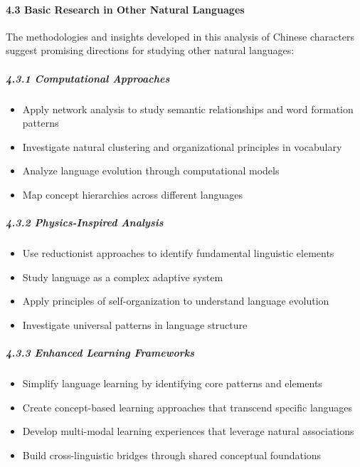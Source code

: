\paragraph{4.3 Basic Research in Other Natural
Languages}\label{basic-research-in-other-natural-languages}

The methodologies and insights developed in this analysis of Chinese
characters suggest promising directions for studying other natural
languages:

\subparagraph{4.3.1 Computational
Approaches}\label{computational-approaches}

\begin{itemize}
\tightlist
\item
  Apply network analysis to study semantic relationships and word
  formation patterns
\item
  Investigate natural clustering and organizational principles in
  vocabulary
\item
  Analyze language evolution through computational models
\item
  Map concept hierarchies across different languages
\end{itemize}

\subparagraph{4.3.2 Physics-Inspired
Analysis}\label{physics-inspired-analysis}

\begin{itemize}
\tightlist
\item
  Use reductionist approaches to identify fundamental linguistic
  elements
\item
  Study language as a complex adaptive system
\item
  Apply principles of self-organization to understand language evolution
\item
  Investigate universal patterns in language structure
\end{itemize}

\subparagraph{4.3.3 Enhanced Learning
Frameworks}\label{enhanced-learning-frameworks}

\begin{itemize}
\tightlist
\item
  Simplify language learning by identifying core patterns and elements
\item
  Create concept-based learning approaches that transcend specific
  languages
\item
  Develop multi-modal learning experiences that leverage natural
  associations
\item
  Build cross-linguistic bridges through shared conceptual foundations
\end{itemize}

